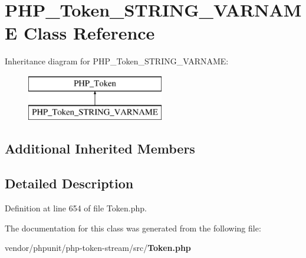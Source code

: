 \section{P\+H\+P\+\_\+\+Token\+\_\+\+S\+T\+R\+I\+N\+G\+\_\+\+V\+A\+R\+N\+A\+M\+E Class Reference}
\label{class_p_h_p___token___s_t_r_i_n_g___v_a_r_n_a_m_e}
Inheritance diagram for P\+H\+P\+\_\+\+Token\+\_\+\+S\+T\+R\+I\+N\+G\+\_\+\+V\+A\+R\+N\+A\+M\+E\+:\begin{figure}[H]
\begin{center}
\leavevmode
\includegraphics[height=2.000000cm]{class_p_h_p___token___s_t_r_i_n_g___v_a_r_n_a_m_e}
\end{center}
\end{figure}
\subsection*{Additional Inherited Members}


\subsection{Detailed Description}


Definition at line 654 of file Token.\+php.



The documentation for this class was generated from the following file\+:\begin{DoxyCompactItemize}
\item 
vendor/phpunit/php-\/token-\/stream/src/{\bf Token.\+php}\end{DoxyCompactItemize}
